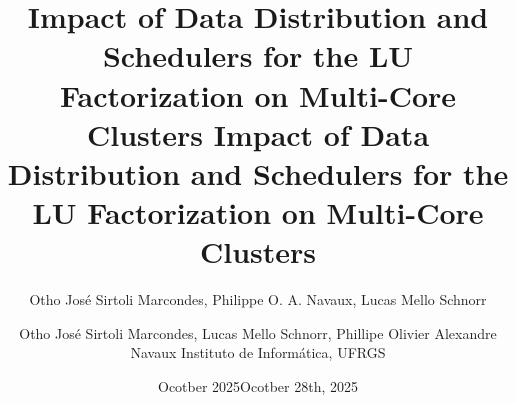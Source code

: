 \documentclass[12pt,xcolor=dvipsnames,presentation,aspectratio=169]{beamer}
\author{Otho José Sirtoli Marcondes, Philippe O. A. Navaux, Lucas Mello Schnorr}
\date{Ocotber 2025}
\title{Impact of Data Distribution and Schedulers for the LU Factorization on Multi-Core Clusters Impact of Data Distribution and Schedulers for the LU Factorization on Multi-Core Clusters}
\begin{document}
\let\alert=\structure
\let\epsilon=\varepsilon
\let\leq=\leqslant
\let\geq=\geqslant

{%

\author{Otho José Sirtoli Marcondes, Lucas Mello Schnorr, Phillipe Olivier Alexandre Navaux \newline Instituto de Informática, UFRGS}

\date{Ocotber 28th, 2025 \\\smallskip}


\maketitle
}
\end{document}

